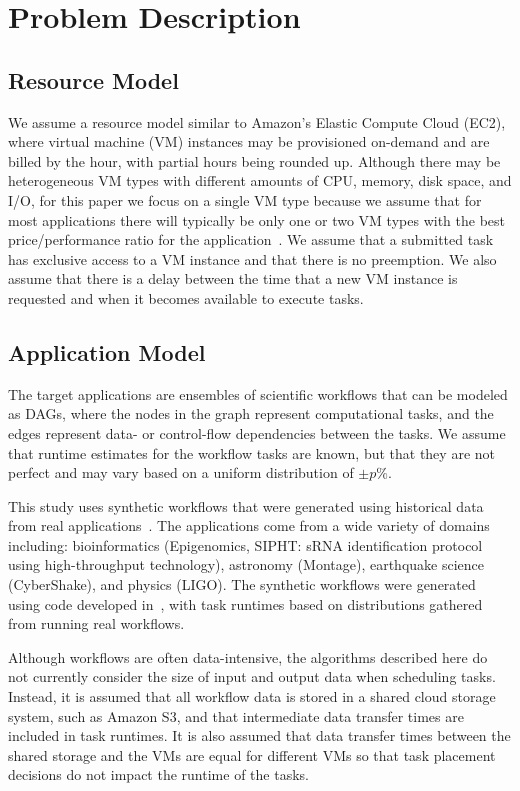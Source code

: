 \documentclass[preprint,5p]{elsarticle}
\begin{document}
 
\section{Problem Description}
\label{sec:problem}

\subsection{Resource Model}  
We assume a resource model similar to Amazon's Elastic Compute Cloud (EC2),
where virtual machine (VM) instances may be provisioned on-demand and are billed by
the hour, with partial hours being rounded up. Although there may be
heterogeneous VM types with different amounts of CPU, memory, disk space, and
I/O, for this paper we focus on a single VM type because we assume that for most
applications there will typically be only one or two VM types with the best
price/performance ratio for the application~\cite{Juve2009}. We assume that
a submitted task has exclusive access to a VM instance and that there is no
preemption. We also assume that there is a delay between the time that a new VM
instance is requested and when it becomes available to execute tasks.

\subsection{Application Model} 
The target applications are ensembles of
scientific workflows that can be modeled as DAGs, where the nodes in the graph
represent computational tasks, and the edges represent data- or control-flow
dependencies between the tasks. We assume that runtime estimates for the
workflow tasks are known, but that they are not perfect and may vary based on
a uniform distribution of $\pm p\%$.

This study uses synthetic workflows that were generated using historical data
from real applications~\cite{Bharathi2008}. The applications come from a wide
variety of domains including: bioinformatics (Epigenomics, SIPHT: sRNA
identification protocol using high-throughput technology), astronomy
(Montage), earthquake science (CyberShake), and physics (LIGO). The synthetic
workflows were generated using code developed in~\cite{WorkflowGenerator},
with task runtimes based on distributions gathered from running real
workflows.

Although workflows are often data-intensive, the algorithms described
here do not currently consider the size of input and output data
when scheduling tasks. Instead, it is assumed that all workflow data is stored in
a shared cloud storage system, such as Amazon S3, and that intermediate data
transfer times are included in task runtimes. It is also assumed that
data transfer times between the shared storage and the VMs are equal for
different VMs so that task placement decisions do not impact the
runtime of the tasks.
\end{document}
